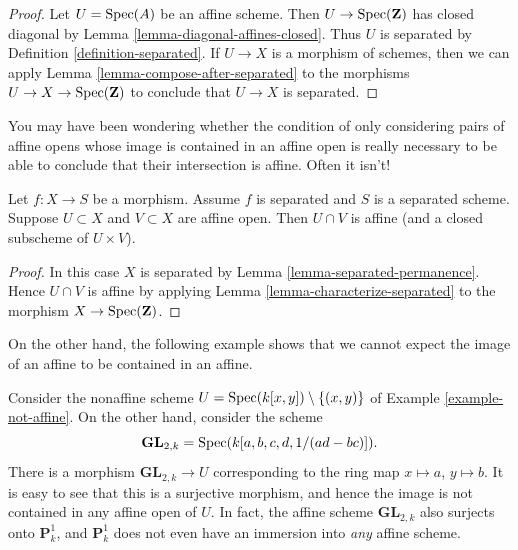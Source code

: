 \begin{proof}
Let $U = \mathop{\mathrm{Spec}}(A)$ be an affine scheme. Then $U \to \mathop{\mathrm{Spec}}(\mathbf{Z})$
has closed diagonal by Lemma \ref{lemma-diagonal-affines-closed}.
Thus $U$ is separated by Definition \ref{definition-separated}.
If $U \to X$ is a morphism of schemes, then we can apply
Lemma \ref{lemma-compose-after-separated}
to the morphisms $U \to X \to \mathop{\mathrm{Spec}}(\mathbf{Z})$ to conclude
that $U \to X$ is separated.
\end{proof}

\noindent
You may have been wondering whether the condition
of only considering pairs of affine opens whose image is contained
in an affine open is really necessary to be able to conclude
that their intersection is affine. Often it isn't!

\begin{lemma}
\label{lemma-curiosity}
Let $f : X \to S$ be a morphism.
Assume $f$ is separated and $S$ is a separated scheme.
Suppose $U \subset X$ and $V \subset X$ are affine open.
Then $U \cap V$ is affine (and a closed subscheme of $U \times V$).
\end{lemma}

\begin{proof}
In this case $X$ is separated by Lemma \ref{lemma-separated-permanence}.
Hence $U \cap V$ is affine by
applying Lemma \ref{lemma-characterize-separated} to the
morphism $X \to \mathop{\mathrm{Spec}}(\mathbf{Z})$.
\end{proof}

\noindent
On the other hand, the following example shows that we cannot
expect the image of an affine to be contained in an affine.

\begin{example}
\label{example-image-affine-projective}
Consider the nonaffine scheme
$U = \mathop{\mathrm{Spec}}(k[x, y]) \setminus \{(x, y)\}$ of
Example \ref{example-not-affine}. On the other hand, consider the
scheme
$$
\mathbf{GL}_{2, k} = \mathop{\mathrm{Spec}}(k[a, b, c, d, 1/(ad - bc)]).
$$
There is a morphism $\mathbf{GL}_{2, k} \to U$ corresponding
to the ring map $x \mapsto a$, $y \mapsto b$. It is easy to see that
this is a surjective morphism, and hence the image is not contained
in any affine open of $U$. In fact, the affine scheme
$\mathbf{GL}_{2, k}$ also surjects onto $\mathbf{P}^1_k$, and
$\mathbf{P}^1_k$ does not even have an immersion into {\it any} affine scheme.
\end{example}

